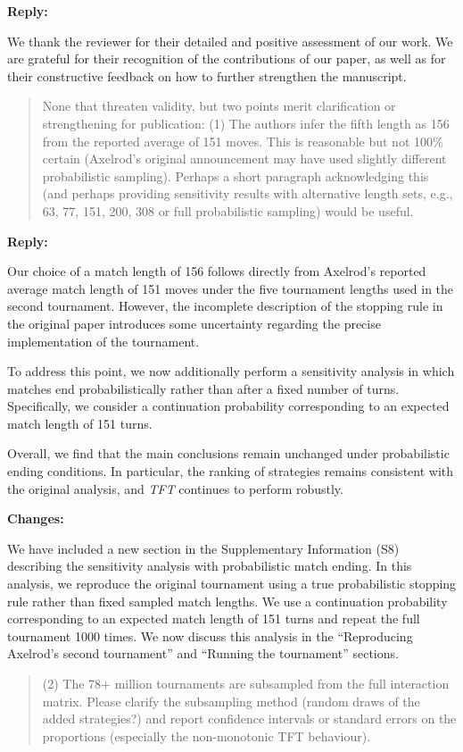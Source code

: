\documentclass[11pt]{article}
\newcommand{\reply}{
\vspace{0.25em}
{\color{ForestGreen}\textbf{Reply:}}
}
\newcommand{\changes}{
\vspace{0.25em}
{\color{BrickRed}\textbf{Changes:}}
}
\newenvironment{reviewercomment}
{
\vspace{0.5em}
\begin{quote}
\color{NavyBlue}
}
{
\end{quote}
}
\newcommand{\TFT}{\emph{TFT}}
\begin{document}
\reply

We thank the reviewer for their detailed and positive assessment of our work.
We are grateful for their recognition of the contributions of our paper, as
well as for their constructive feedback on how to further strengthen the
manuscript.

\begin{reviewercomment}
None that threaten validity, but two points merit clarification or strengthening
for publication: (1) The authors infer the fifth length as 156 from the reported
average of 151 moves. This is reasonable but not 100\% certain (Axelrod's
original announcement may have used slightly different probabilistic sampling).
Perhaps a short paragraph acknowledging this (and perhaps providing sensitivity
results with alternative length sets, e.g., {63, 77, 151, 200, 308} or full
probabilistic sampling) would be useful. 
\end{reviewercomment}

\reply

Our choice of a match length of 156 follows directly from Axelrod's reported
average match length of 151 moves under the five tournament lengths used in the
second tournament. However, the incomplete description of the stopping rule in
the original paper introduces some uncertainty regarding the precise
implementation of the tournament.

To address this point, we now additionally perform a sensitivity analysis in
which matches end probabilistically rather than after a fixed number of turns.
Specifically, we consider a continuation probability corresponding to an
expected match length of 151 turns.

Overall, we find that the main conclusions remain unchanged under probabilistic
ending conditions. In particular, the ranking of strategies remains consistent
with the original analysis, and \TFT{} continues to perform robustly.

\changes
We have included a new section in the Supplementary Information (S8)
describing the sensitivity analysis with probabilistic match ending. In this
analysis, we reproduce the original tournament using a true probabilistic
stopping rule rather than fixed sampled match lengths. We use a continuation
probability corresponding to an expected match length of 151 turns and repeat
the full tournament 1000 times.
We now discuss this analysis in the ``Reproducing Axelrod's second tournament''
and ``Running the tournament'' sections.

\begin{reviewercomment}
(2) The 78+ million tournaments are subsampled from the full interaction matrix.
Please clarify the subsampling method (random draws of the added strategies?)
and report confidence intervals or standard errors on the proportions
(especially the non-monotonic TFT behaviour).
\end{reviewercomment}
\end{document}
